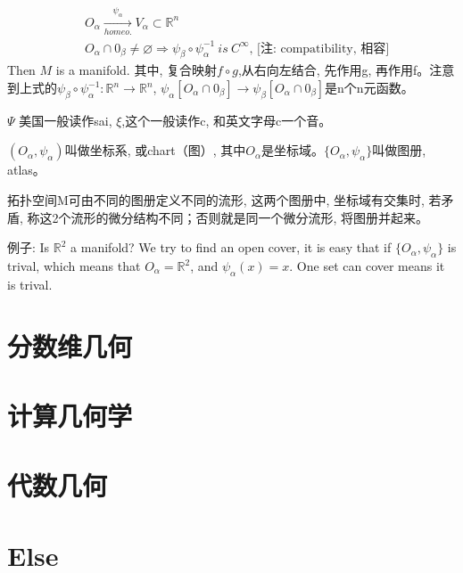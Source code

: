 \documentclass[UTF8]{../09-Mathematics}
\begin{document}
\begin{displaymath}
  \begin{split}
    & O _\alpha \xrightarrow[homeo.]{\psi_\alpha } V_\alpha \subset \mathbb R^n \\
    & O_\alpha \cap 0_\beta \neq \varnothing \Longrightarrow \psi_\beta \circ \psi_\alpha ^ {-1} \ is \ C^ \infty \mbox{, [注: compatibility, 相容]}
  \end{split}
\end{displaymath}
Then $M$ is a manifold. 其中, 复合映射$f \circ g$,从右向左结合, 先作用g, 再作用f。注意到上式的$\psi_\beta \circ \psi_\alpha ^ {-1}: \mathbb R^n \to \mathbb R^n$, $\psi_\alpha[O_\alpha \cap 0_\beta] \to \psi_\beta[O_\alpha \cap 0_\beta] $是n个n元函数。


$\Psi$ 美国一般读作sai, $\xi$,这个一般读作c,  和英文字母c一个音。

$( O_\alpha, \psi_\alpha)$叫做坐标系, 或chart（图）, 其中$O_\alpha$是坐标域。$\{ O_\alpha, \psi_\alpha \}$叫做图册, atlas。

拓扑空间M可由不同的图册定义不同的流形, 这两个图册中, 坐标域有交集时, 若矛盾, 称这2个流形的微分结构不同；否则就是同一个微分流形, 将图册并起来。

例子: Is $\mathbb R^2$ a manifold? We try to find an open cover, it is easy that  if $\{ O_\alpha, \psi_\alpha \}$ is trival, which means that $O_\alpha = \mathbb R^2$, and $\psi_\alpha (x) = x $. One set can cover means it is trival.



\chapter{分数维几何}
\chapter{计算几何学}
\chapter{代数几何}



\chapter{Else}
\end{document}
